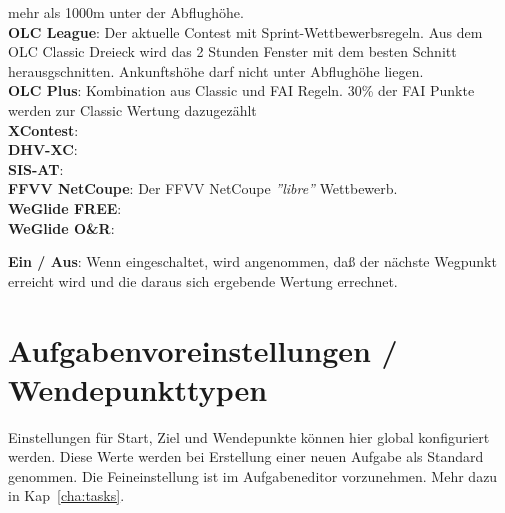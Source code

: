 \begin{description}
   mehr als 1000m unter der Abflughöhe. \\
   {\bf OLC League}: Der aktuelle Contest mit Sprint-Wettbewerbsregeln.
   Aus dem OLC Classic Dreieck wird das 2 Stunden Fenster mit dem besten Schnitt herausgschnitten. 
   Ankunftshöhe darf nicht unter Abflughöhe liegen.\\
  {\bf OLC Plus}: Kombination aus Classic und FAI Regeln. 30\% der FAI Punkte werden zur
   Classic Wertung dazugezählt \\
  {\bf XContest}:  \\
  {\bf DHV-XC}:  \\
  {\bf SIS-AT}:  \\
  {\bf FFVV NetCoupe}: Der FFVV NetCoupe {\it ''libre''} Wettbewerb. \\
  {\bf WeGlide FREE}:  \\
  {\bf WeGlide O\&R}:  \\
\item[\textit{Wertungs-Vorhersage}]  {\bf Ein / Aus}: Wenn eingeschaltet, wird angenommen, daß der nächste Wegpunkt erreicht wird und
die daraus sich ergebende Wertung errechnet.
\end{description}


\section{Aufgabenvoreinstellungen  / Wendepunkttypen}

Einstellungen für Start, Ziel und Wendepunkte können hier global konfiguriert werden.
Diese Werte werden bei Erstellung einer neuen Aufgabe als Standard genommen.
Die Feineinstellung  ist im Aufgabeneditor vorzunehmen.
Mehr dazu in Kap~\ref{cha:tasks}. 


